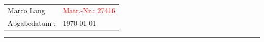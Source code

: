 \begin{center}
{\fontsize{12pt}{12} \selectfont%
\begin{tabular}{ll}
Marco Lang & \textcolor{red}{Matr.-Nr.: 27416}\\[0.5ex] %
Abgabedatum :& \today   %
\end{tabular}
}
\end{center}
                               

\vspace{1cm}

\vspace{1cm}
\hrule



